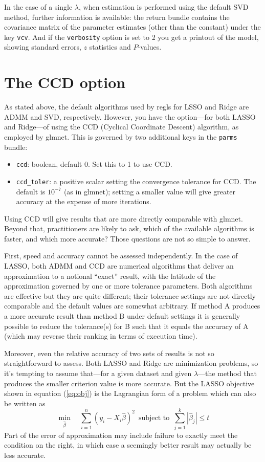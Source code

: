\documentclass{article}
\begin{document}
In the case of a single $\lambda$, when estimation is performed using
the default SVD method, further information is available: the return
bundle contains the covariance matrix of the parameter estimates
(other than the constant) under the key \texttt{vcv}. And if the
\texttt{verbosity} option is set to 2 you get a printout of the model,
showing standard errors, $z$ statistics and $P$-values.

\section{The CCD option}
\label{sec:ccd}

As stated above, the default algorithms used by \textsf{regls} for
LSSO and Ridge are ADMM and SVD, respectively. However, you have the
option---for both LASSO and Ridge---of using the CCD (Cyclical
Coordinate Descent) algorithm, as employed by \textsf{glmnet}. This is
governed by two additional keys in the \texttt{parms} bundle:
\begin{itemize}
\item \texttt{ccd}: boolean, default 0. Set this to 1 to use CCD.
\item \texttt{ccd\_toler}: a positive scalar setting the convergence
  tolerance for CCD. The default is $10^{-7}$ (as in \textsf{glmnet});
  setting a smaller value will give greater accuracy at the expense of
  more iterations.
\end{itemize}

Using CCD will give results that are more directly comparable with
\textsf{glmnet}. Beyond that, practitioners are likely to ask, which
of the available algorithms is faster, and which more accurate? Those
questions are not so simple to answer.

First, speed and accuracy cannot be assessed independently. In the
case of LASSO, both ADMM and CCD are numerical algorithms that deliver
an approximation to a notional ``exact'' result, with the latitude of
the approximation governed by one or more tolerance parameters. Both
algorithms are effective but they are quite different; their tolerance
settings are not directly comparable and the default values are
somewhat arbitrary. If method A produces a more accurate result than
method B under default settings it is generally possible to reduce the
tolerance(s) for B such that it equals the accuracy of A (which may
reverse their ranking in terms of execution time).

Moreover, even the relative accuracy of two sets of results is not so
straightforward to assess. Both LASSO and Ridge are minimization
problems, so it's tempting to assume that---for a given dataset and
given $\lambda$---the method that produces the smaller criterion value
is more accurate. But the LASSO objective shown in equation
(\ref{eq:obj}) is the Lagrangian form of a problem which can also be
written as
\[
  \min_{\hat{\beta}} \quad
  \sum_{i=1}^n (y_i - X_i\hat{\beta})^2 \,\mbox{ subject to }\,
  \sum_{j=1}^k |\hat{\beta}_j| \leq t
\]
Part of the error of approximation may include failure to exactly meet
the condition on the right, in which case a seemingly better result
may actually be less accurate.
\end{document}
